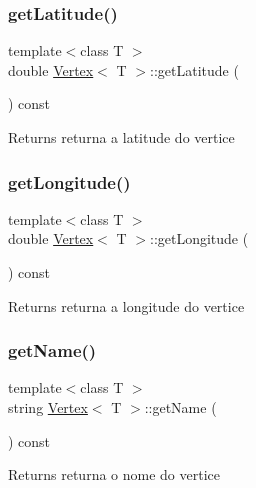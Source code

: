 \subsubsection{\texorpdfstring{get\+Latitude()}{getLatitude()}}
{\footnotesize\ttfamily template$<$class T $>$ \\
double \mbox{\hyperlink{class_vertex}{Vertex}}$<$ T $>$\+::get\+Latitude (\begin{DoxyParamCaption}{ }\end{DoxyParamCaption}) const}

\begin{DoxyReturn}{Returns}
returna a latitude do vertice 
\end{DoxyReturn}
\mbox{\label{class_vertex_ae026f50ccedda655c5d5d8a1aba0b018}} 
\subsubsection{\texorpdfstring{get\+Longitude()}{getLongitude()}}
{\footnotesize\ttfamily template$<$class T $>$ \\
double \mbox{\hyperlink{class_vertex}{Vertex}}$<$ T $>$\+::get\+Longitude (\begin{DoxyParamCaption}{ }\end{DoxyParamCaption}) const}

\begin{DoxyReturn}{Returns}
returna a longitude do vertice 
\end{DoxyReturn}
\mbox{\label{class_vertex_a0c8391ea72196e5a0d05838a22f95e0d}} 
\subsubsection{\texorpdfstring{get\+Name()}{getName()}}
{\footnotesize\ttfamily template$<$class T $>$ \\
string \mbox{\hyperlink{class_vertex}{Vertex}}$<$ T $>$\+::get\+Name (\begin{DoxyParamCaption}{ }\end{DoxyParamCaption}) const}

\begin{DoxyReturn}{Returns}
returna o nome do vertice 
\end{DoxyReturn}
\mbox{\label{class_vertex_aab5816625f7aa9ee8f3c1b1401673a61}} 
